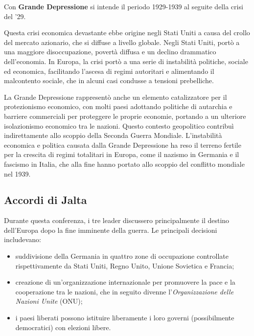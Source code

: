 \documentclass[a4paper]{article}
\begin{document}
Con \textbf{Grande Depressione} si intende il periodo 1929-1939 al seguite della crisi del '29.

Questa crisi economica devastante ebbe origine negli Stati Uniti a causa del crollo del mercato azionario,
che si diffuse a livello globale.
Negli Stati Uniti, portò a una maggiore disoccupazione, povertà diffusa e un
declino drammatico dell'economia.
In Europa, la crisi portò a una serie di instabilità politiche, sociale ed economica,
facilitando l'ascesa di regimi autoritari e alimentando il malcontento sociale,
che in alcuni casi condusse a tensioni prebelliche.

La Grande Depressione rappresentò anche un elemento catalizzatore per il protezionismo economico,
con molti paesi adottando politiche di autarchia e barriere commerciali per proteggere le proprie economie,
portando a un ulteriore isolazionismo economico tra le nazioni.
Questo contesto geopolitico contribuì indirettamente allo scoppio della Seconda Guerra Mondiale.
L'instabilità economica e politica causata dalla Grande Depressione ha reso il terreno
fertile per la crescita di regimi totalitari in Europa, come il nazismo in Germania e il fascismo in Italia,
che alla fine hanno portato allo scoppio del conflitto mondiale nel 1939.

\subsection{Accordi di Jalta}


Durante questa conferenza, i tre leader discussero principalmente il destino dell'Europa dopo la fine imminente della guerra. Le principali decisioni includevano:

\begin{itemize}
    \item suddivisione della Germania in quattro zone di occupazione controllate rispettivamente
        da Stati Uniti, Regno Unito, Unione Sovietica e Francia;
    \item creazione di un'organizzazione internazionale per promuovere la pace e la cooperazione tra le nazioni, che in seguito divenne l'\textit{Organizzazione delle Nazioni Unite} (ONU);
    \item i paesi liberati possono istituire liberamente i loro governi (possibilmente democratici) con elezioni libere.
\end{itemize}
\end{document}
